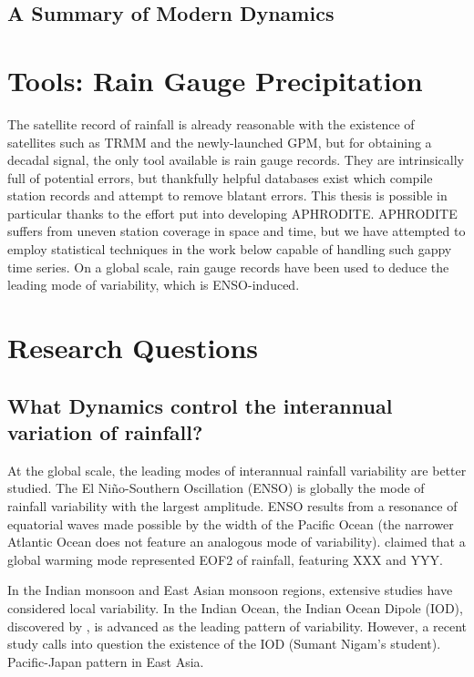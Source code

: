 \subsection{A Summary of Modern Dynamics}

\section{Tools: Rain Gauge Precipitation}

The satellite record of rainfall is already reasonable with the existence of satellites such as TRMM and the newly-launched GPM, but for obtaining a decadal signal, the only tool available is rain gauge records. They are intrinsically full of potential errors, but thankfully helpful databases exist which compile station records and attempt to remove blatant errors. This thesis is possible in particular thanks to the effort put into developing APHRODITE. APHRODITE suffers from uneven station coverage in space and time, but we have attempted to employ statistical techniques in the work below capable of handling such gappy time series. On a global scale, rain gauge records have been used to deduce the leading mode of variability, which is ENSO-induced.

\section{Research Questions}

\subsection{What Dynamics control the interannual variation of rainfall?}
	
	At the global scale, the leading modes of interannual rainfall variability are better studied. The El Ni\~no-Southern Oscillation (ENSO) is globally the mode of rainfall variability with the largest amplitude. ENSO results from a resonance of equatorial waves made possible by the width of the Pacific Ocean (the narrower Atlantic Ocean does not feature an analogous mode of variability). \cite{Dai} claimed that a global warming mode represented EOF2 of rainfall, featuring XXX and YYY. 	
	
	In the Indian monsoon and East Asian monsoon regions, extensive studies have considered local variability. In the Indian Ocean, the Indian Ocean Dipole (IOD), discovered by \cite{Goswami}, is advanced as the leading pattern of variability. However, a recent study calls into question the existence of the IOD (Sumant Nigam's student).
 Pacific-Japan pattern in East Asia.



